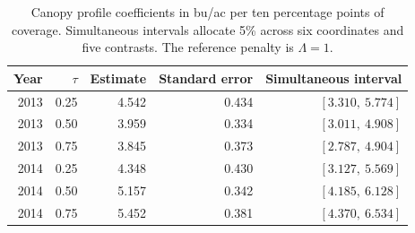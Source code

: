 \begin{table}[t]
\centering
\small
\caption{Canopy profile coefficients in bu/ac per ten percentage points of coverage. Simultaneous intervals allocate 5\% across six coordinates and five contrasts. The reference penalty is $\Lambda=1$.}
\label{tab:soy-reference}
\begin{tabular}{rrrrr}
\toprule
Year & $\tau$ & Estimate & Standard error & Simultaneous interval \\
\midrule
2013 & 0.25 & 4.542 & 0.434 & $[3.310,\ 5.774]$ \\
2013 & 0.50 & 3.959 & 0.334 & $[3.011,\ 4.908]$ \\
2013 & 0.75 & 3.845 & 0.373 & $[2.787,\ 4.904]$ \\
2014 & 0.25 & 4.348 & 0.430 & $[3.127,\ 5.569]$ \\
2014 & 0.50 & 5.157 & 0.342 & $[4.185,\ 6.128]$ \\
2014 & 0.75 & 5.452 & 0.381 & $[4.370,\ 6.534]$ \\
\bottomrule
\end{tabular}
\end{table}
